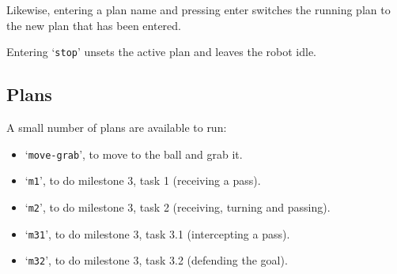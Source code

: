 \documentclass[12pt,a4paper]{article}
\begin{document}
Likewise, entering a plan name and pressing enter switches the running plan to the new plan that has been entered. 

Entering `\texttt{stop}' unsets the active plan and leaves the robot idle.

\subsection{Plans}

A small number of plans are available to run:

\begin{itemize}
    \item `\texttt{move-grab}', to move to the ball and grab it.
    \item `\texttt{m1}', to do milestone 3, task 1 (receiving a pass).
    \item `\texttt{m2}', to do milestone 3, task 2 (receiving, turning and passing).
    \item `\texttt{m31}', to do milestone 3, task 3.1 (intercepting a pass).
    \item `\texttt{m32}', to do milestone 3, task 3.2 (defending the goal).
\end{itemize}








\end{document}
